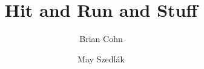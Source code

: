\documentclass[a4paper,11pt]{article}
\theoremstyle{plain}
\theoremstyle{definition}
\theoremstyle{remark}
\newcommand{\1}{\mathbf{1}}
\begin{document}
\linenumbers

\title{Hit and Run and Stuff}
\author{Brian Cohn \and May Szedl\'{a}k}
\begin{titlepage}
\maketitle
\thispagestyle{empty}

\end{titlepage}










%
\end{document}
